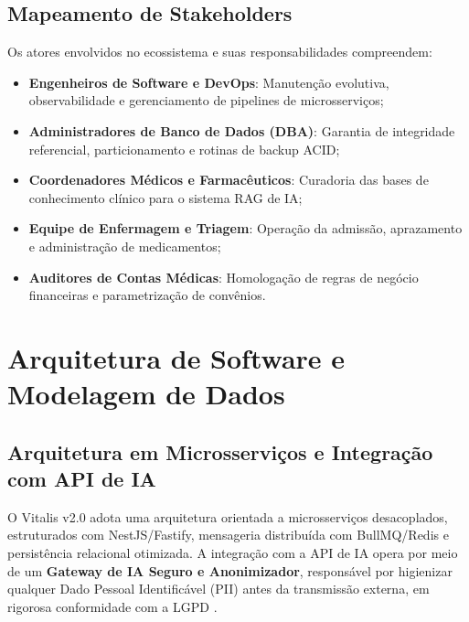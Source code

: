 \documentclass[12pt,oneside,a4paper,article]{abntex2}
\begin{document}
\subsection{Mapeamento de Stakeholders}
Os atores envolvidos no ecossistema e suas responsabilidades compreendem:
\begin{itemize}[noitemsep]
  \item \textbf{Engenheiros de Software e DevOps}: Manutenção evolutiva, observabilidade e gerenciamento de pipelines de microsserviços;
  \item \textbf{Administradores de Banco de Dados (DBA)}: Garantia de integridade referencial, particionamento e rotinas de backup ACID;
  \item \textbf{Coordenadores Médicos e Farmacêuticos}: Curadoria das bases de conhecimento clínico para o sistema RAG de IA;
  \item \textbf{Equipe de Enfermagem e Triagem}: Operação da admissão, aprazamento e administração de medicamentos;
  \item \textbf{Auditores de Contas Médicas}: Homologação de regras de negócio financeiras e parametrização de convênios.
\end{itemize}
\section{Arquitetura de Software e Modelagem de Dados}
\subsection{Arquitetura em Microsserviços e Integração com API de IA}
O Vitalis v2.0 adota uma arquitetura orientada a microsserviços desacoplados, estruturados com NestJS/Fastify, mensageria distribuída com BullMQ/Redis e persistência relacional otimizada. A integração com a API de IA opera por meio de um \textbf{Gateway de IA Seguro e Anonimizador}, responsável por higienizar qualquer Dado Pessoal Identificável (PII) antes da transmissão externa, em rigorosa conformidade com a LGPD \cite{brasil_lgpd:2018}.
\end{document}
